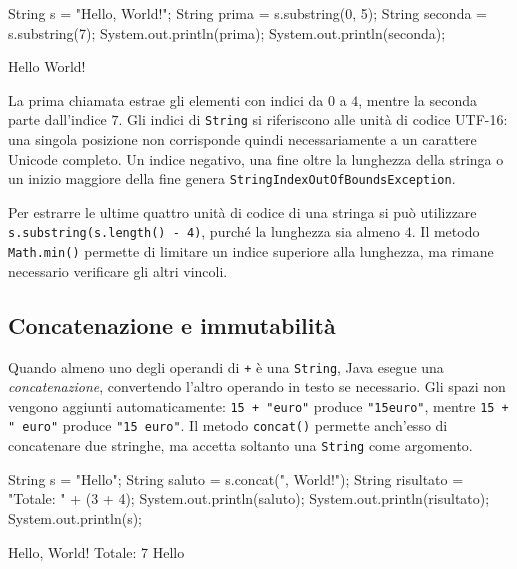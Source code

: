 \begin{unipdcode}[language=Java]
String s = "Hello, World!";
String prima = s.substring(0, 5);
String seconda = s.substring(7);
System.out.println(prima);
System.out.println(seconda);
\end{unipdcode}

\begin{unipdterminal}
Hello
World!
\end{unipdterminal}

La prima chiamata estrae gli elementi con indici
da \(0\) a \(4\), mentre la seconda parte
dall'indice \(7\). Gli indici di \texttt{String}
si riferiscono alle unità di codice UTF-16:
una singola posizione non corrisponde quindi
necessariamente a un carattere Unicode completo.
Un indice negativo, una fine oltre la lunghezza
della stringa o un inizio maggiore della fine
genera \texttt{StringIndexOutOfBoundsException}.

Per estrarre le ultime quattro unità di codice
di una stringa si può utilizzare
\texttt{s.substring(s.length() - 4)}, purché
la lunghezza sia almeno \(4\). Il metodo
\texttt{Math.min()} permette di limitare un
indice superiore alla lunghezza, ma rimane
necessario verificare gli altri vincoli.

\subsection{Concatenazione e immutabilità}
\label{sec:fi-java-concatenazione}

Quando almeno uno degli operandi di \texttt{+}
è una \texttt{String}, Java esegue una
\emph{concatenazione}, convertendo l'altro
operando in testo se necessario. Gli spazi
non vengono aggiunti automaticamente:
\texttt{15 + "euro"} produce \texttt{"15euro"},
mentre \texttt{15 + " euro"} produce
\texttt{"15 euro"}. Il metodo \texttt{concat()}
permette anch'esso di concatenare due stringhe,
ma accetta soltanto una \texttt{String} come
argomento.

\begin{unipdcode}[language=Java]
String s = "Hello";
String saluto = s.concat(", World!");
String risultato = "Totale: " + (3 + 4);
System.out.println(saluto);
System.out.println(risultato);
System.out.println(s);
\end{unipdcode}

\begin{unipdterminal}
Hello, World!
Totale: 7
Hello
\end{unipdterminal}

